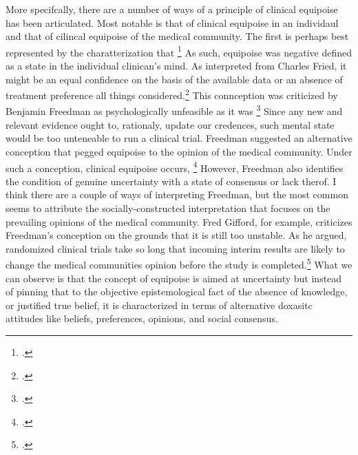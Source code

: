 \documentclass[letterpaper,notitlepage,12pt]{article}
\begin{document}
More specifcally, there are a number of ways of a principle of clinical
equipoise has been articulated.
Most notable is that of clinical equipoise in an individaul and that of cilincal
equipoise of the medical community.
The first is perhaps best represented by the charatterization that \footcite{Shaw and Chalmers 1970}
As such, equipoise was negative defined as a state in the individual clinican's
mind.
As interpreted from Charles Fried, it might be an equal confidence on the basis
of the available data or an absence of treatment preference all things
considered.\footcite{Fried 1974}
This connception was criticized by Benjamin Freedman as psychologically
unfeasible as it was \footcite{Freedman,
1987, 143}
Since any new and relevant evidence ought to, rationaly, update our credences,
such mental state would be too unteneable to run a clinical trial.
Freedman suggested an alternative conception that pegged equipoise to the
opinion of the medical community.
Under such a conception, clinical equipoise occurs, \footcite{freedman 1987}
However, Freedman also identifies the condition of genuine uncertainty with a
state of consensus or lack therof.
I think there are a couple of ways of interpreting Freedman, but the most common
seems to attribute the socially-constructed interpretation that focuses on the
prevailing opinions of the medical community.
Fred Gifford, for example, criticizes Freedman's conception on the grounds that
it is still too unstable.
As he argued, randomized clinical trials take so long that incoming interim
results are likely to change the medical communities opinion before the study is
completed.\footcite{Gifford 1995 129}
What we can observe is that the concept of equipoise is aimed at uncertainty but
instead of pinning that to the objective epistemological fact of the absence of
knowledge, or justified true belief, it is characterized in terms of alternative
doxasitc attitudes like beliefs, preferences, opinions, and social consensus.
\end{document}
